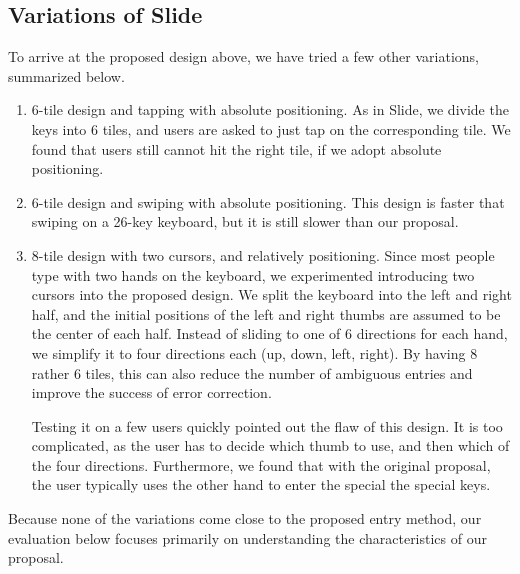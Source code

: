 \subsection{Variations of Slide}
 
To arrive at the proposed design above, we have tried a few other variations, summarized below. 

\begin{enumerate}
\item
6-tile design and tapping with absolute positioning.  As in Slide, we divide the keys into 6 tiles, and users are asked to just tap on the corresponding tile.  We found that users still cannot hit the right tile, if we adopt absolute positioning.

\item
6-tile design and swiping with absolute positioning.  This design is faster that swiping on a 26-key keyboard, but it is still slower than our proposal. 

\item 
8-tile design with two cursors, and relatively positioning.  Since most people type with two hands on the keyboard, we experimented introducing two cursors into the proposed design.  We split the keyboard into the left and right half, and the initial positions of the left and right thumbs are assumed to be the center of each half.  Instead of sliding to one of 6 directions for each hand, we simplify it to four directions each (up, down, left,  right).  By having 8 rather 6 tiles, this can also reduce the number of ambiguous entries and improve the success of error correction.  

Testing it on a few users quickly pointed out the flaw of this design.  It is too complicated, as the user has to decide which thumb to use, and then which of the four directions.  Furthermore, we found that with the original proposal, the user typically uses the other hand to enter the special the special keys.
\end{enumerate}

Because none of the variations come close to the proposed entry method, our evaluation below focuses primarily on understanding the characteristics of our proposal. 

